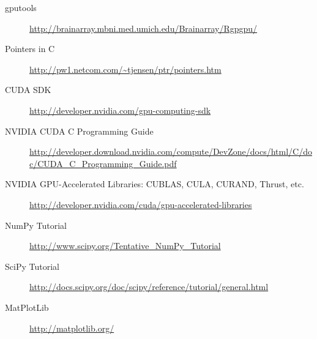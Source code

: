 \documentclass{article}
\begin{document}
\begin{description}
\item[gputools] \url{http://brainarray.mbni.med.umich.edu/Brainarray/Rgpgpu/}
\item[Pointers in C] \url{http://pw1.netcom.com/~tjensen/ptr/pointers.htm}
\item[CUDA SDK] \url{http://developer.nvidia.com/gpu-computing-sdk} 
\item[NVIDIA CUDA C Programming Guide] \url{http://developer.download.nvidia.com/compute/DevZone/docs/html/C/doc/CUDA_C_Programming_Guide.pdf}
\item[NVIDIA GPU-Accelerated Libraries: CUBLAS, CULA, CURAND, Thrust, etc.] \url{http://developer.nvidia.com/cuda/gpu-accelerated-libraries}
\item[NumPy Tutorial] \url{http://www.scipy.org/Tentative\_NumPy\_Tutorial}
\item[SciPy Tutorial] \url{http://docs.scipy.org/doc/scipy/reference/tutorial/general.html}
\item[MatPlotLib] \url{http://matplotlib.org/}
\end{description}





\end{document}
